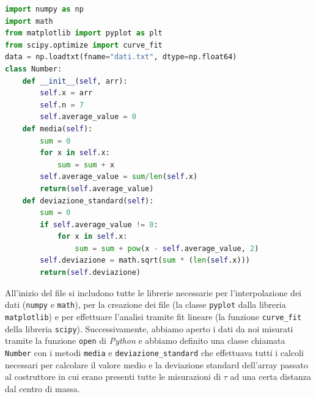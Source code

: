 \documentclass{article}
\begin{document}
\newpage
\begin{minipage}{0.5\textwidth}
	\begin{lstlisting}[language=Python]
import numpy as np
import math
from matplotlib import pyplot as plt 
from scipy.optimize import curve_fit
data = np.loadtxt(fname="dati.txt", dtype=np.float64)
class Number:
    def __init__(self, arr):
        self.x = arr
        self.n = 7
        self.average_value = 0
    def media(self):
        sum = 0
        for x in self.x:
            sum = sum + x
        self.average_value = sum/len(self.x)
        return(self.average_value)
    def deviazione_standard(self):
        sum = 0
        if self.average_value != 0:
            for x in self.x:
                sum = sum + pow(x - self.average_value, 2)
        self.deviazione = math.sqrt(sum * (len(self.x)))
        return(self.deviazione)
\end{lstlisting}
\end{minipage}
\hspace{0.025\textwidth}
\begin{minipage}{0.5\textwidth}
All'inizio del file si includono tutte le librerie necessarie per l'interpolazione dei dati (\texttt{numpy} e \texttt{math}), per la creazione dei file (la classe \texttt{pyplot} dalla libreria \texttt{matplotlib}) e per effettuare l'analisi tramite fit lineare (la funzione \texttt{curve\_fit} della libreria \texttt{scipy}). Successivamente, abbiamo aperto i dati da noi misurati tramite la funzione \texttt{open} di \emph{Python} e abbiamo definito una classe chiamata \texttt{Number} con i metodi \texttt{media} e \texttt{deviazione\_standard} che effettuava tutti i calcoli necessari per calcolare il valore medio e la deviazione standard dell'array passato al costruttore in cui erano presenti tutte le misurazioni di $\tau$ ad una certa distanza dal centro di massa.
\end{minipage}
\end{document}

